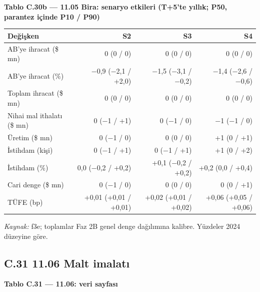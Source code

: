 \endgroup


\textbf{Tablo C.30b --- 11.05 Bira: senaryo etkileri (T+5'te yıllık; P50, parantez içinde P10 / P90)}

\nopagebreak[4]

\begingroup\gbtablo\small

\begin{longtable}[]{@{}lrrr@{}}
\toprule\noalign{}
\textbf{Değişken} & \textbf{S2} & \textbf{S3} & \textbf{S4} \\
\midrule\noalign{}
\endhead
\bottomrule\noalign{}
\endlastfoot
AB'ye ihracat (\$ mn) & 0 (0 / 0) & 0 (0 / 0) & 0 (0 / 0) \\
AB'ye ihracat (\%) & −0,9 (−2,1 / +2,0) & −1,5 (−3,1 / −0,2) & −1,4 (−2,6 / −0,6) \\
Toplam ihracat (\$ mn) & 0 (0 / 0) & 0 (0 / 0) & 0 (0 / 0) \\
Nihai mal ithalatı (\$ mn) & 0 (−1 / +1) & 0 (−1 / 0) & −1 (−1 / 0) \\
Üretim (\$ mn) & 0 (−1 / 0) & 0 (0 / 0) & +1 (0 / +1) \\
İstihdam (kişi) & 0 (−1 / +1) & 0 (−1 / +1) & +1 (0 / +2) \\
İstihdam (\%) & 0,0 (−0,2 / +0,2) & +0,1 (−0,2 / +0,2) & +0,2 (0,0 / +0,4) \\
Cari denge (\$ mn) & 0 (−1 / 0) & 0 (0 / 0) & 0 (0 / +1) \\
TÜFE (bp) & +0,01 (+0,01 / +0,01) & +0,02 (+0,01 / +0,02) & +0,06 (+0,05 / +0,06) \\
\end{longtable}

\endgroup

\emph{Kaynak:} \etiketT{} f3e; toplamlar Faz 2B genel denge dağılımına kalibre. Yüzdeler 2024 düzeyine göre.

\hypertarget{nace_kartlar_10-12-c31-1106-malt-imalatux131}{%
\subsection{C.31 11.06 Malt imalatı}\label{nace_kartlar_10-12-c31-1106-malt-imalatux131}}


\textbf{Tablo C.31 --- 11.06: veri sayfası}

\nopagebreak[4]

\begingroup\gbtablo\small

